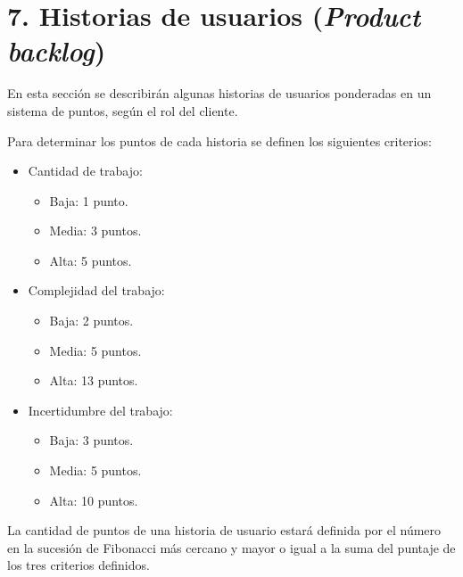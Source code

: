 \documentclass[
11pt, %
]{charter}
\begin{document}
\section{7. Historias de usuarios (\textit{Product backlog})}
\label{sec:backlog}

En esta sección se describirán algunas historias de usuarios ponderadas en un sistema de puntos, según el rol del cliente.

Para determinar los puntos de cada historia se definen los siguientes criterios:
\begin{itemize}
	\item Cantidad de trabajo:
	\begin{itemize}
		\item Baja: 1 punto.
		\item Media: 3 puntos.
		\item Alta: 5 puntos.
	\end{itemize}
	\item Complejidad del trabajo:
		\begin{itemize}
			\item Baja: 2 puntos.
			\item Media: 5 puntos.
			\item Alta: 13 puntos.
		\end{itemize}
	\item Incertidumbre del trabajo:
		\begin{itemize}
			\item Baja: 3 puntos.
			\item Media: 5 puntos.
			\item Alta: 10 puntos.
		\end{itemize}
\end{itemize}

La cantidad de puntos de una historia de usuario estará definida por el número en la sucesión de Fibonacci más cercano y mayor o igual a la suma del puntaje de los tres criterios definidos.
\end{document}
